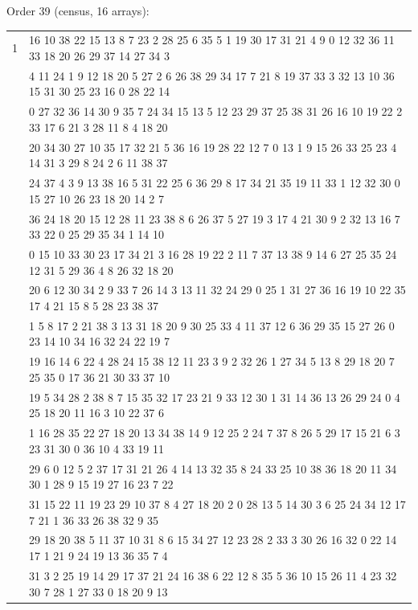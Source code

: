 \documentclass[11pt]{article}
\begin{document}
\noindent Order 39 (census, 16 arrays):\par\nopagebreak
\begingroup\small
\noindent\begin{tabular}{@{}r@{\hskip 8pt}>{\ttfamily\raggedright\arraybackslash}p{}@{}}
\toprule
1 & 24 16 10 38 22 15 13 8 7 23 2 28 25 6 35 5 1 19 30 17 31 21 4 9 0 12 32 36 11 33 18 20 26 29 37 14 27 34 3\\
\addlinespace
2 & 35 4 11 24 1 9 12 18 20 5 27 2 6 26 38 29 34 17 7 21 8 19 37 33 3 32 13 10 36 15 31 30 25 23 16 0 28 22 14\\
\addlinespace
3 & 1 0 27 32 36 14 30 9 35 7 24 34 15 13 5 12 23 29 37 25 38 31 26 16 10 19 22 2 33 17 6 21 3 28 11 8 4 18 20\\
\addlinespace
4 & 18 20 34 30 27 10 35 17 32 21 5 36 16 19 28 22 12 7 0 13 1 9 15 26 33 25 23 4 14 31 3 29 8 24 2 6 11 38 37\\
\addlinespace
5 & 28 24 37 4 3 9 13 38 16 5 31 22 25 6 36 29 8 17 34 21 35 19 11 33 1 12 32 30 0 15 27 10 26 23 18 20 14 2 7\\
\addlinespace
6 & 31 36 24 18 20 15 12 28 11 23 38 8 6 26 37 5 27 19 3 17 4 21 30 9 2 32 13 16 7 33 22 0 25 29 35 34 1 14 10\\
\addlinespace
7 & 1 0 15 10 33 30 23 17 34 21 3 16 28 19 22 2 11 7 37 13 38 9 14 6 27 25 35 24 12 31 5 29 36 4 8 26 32 18 20\\
\addlinespace
8 & 18 20 6 12 30 34 2 9 33 7 26 14 3 13 11 32 24 29 0 25 1 31 27 36 16 19 10 22 35 17 4 21 15 8 5 28 23 38 37\\
\addlinespace
9 & 28 1 5 8 17 2 21 38 3 13 31 18 20 9 30 25 33 4 11 37 12 6 36 29 35 15 27 26 0 23 14 10 34 16 32 24 22 19 7\\
\addlinespace
10 & 31 19 16 14 6 22 4 28 24 15 38 12 11 23 3 9 2 32 26 1 27 34 5 13 8 29 18 20 7 25 35 0 17 36 21 30 33 37 10\\
\addlinespace
11 & 27 19 5 34 28 2 38 8 7 15 35 32 17 23 21 9 33 12 30 1 31 14 36 13 26 29 24 0 4 25 18 20 11 16 3 10 22 37 6\\
\addlinespace
12 & 32 1 16 28 35 22 27 18 20 13 34 38 14 9 12 25 2 24 7 37 8 26 5 29 17 15 21 6 3 23 31 30 0 36 10 4 33 19 11\\
\addlinespace
13 & 3 29 6 0 12 5 2 37 17 31 21 26 4 14 13 32 35 8 24 33 25 10 38 36 18 20 11 34 30 1 28 9 15 19 27 16 23 7 22\\
\addlinespace
14 & 16 31 15 22 11 19 23 29 10 37 8 4 27 18 20 2 0 28 13 5 14 30 3 6 25 24 34 12 17 7 21 1 36 33 26 38 32 9 35\\
\addlinespace
15 & 25 29 18 20 38 5 11 37 10 31 8 6 15 34 27 12 23 28 2 33 3 30 26 16 32 0 22 14 17 1 21 9 24 19 13 36 35 7 4\\
\addlinespace
16 & 34 31 3 2 25 19 14 29 17 37 21 24 16 38 6 22 12 8 35 5 36 10 15 26 11 4 23 32 30 7 28 1 27 33 0 18 20 9 13\\
\bottomrule
\end{tabular}
\endgroup
\end{document}
